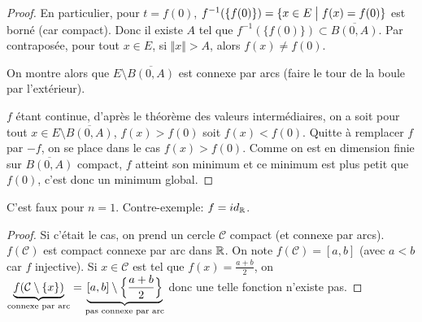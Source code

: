 \begin{proof}
	En particulier, pour $t=f(0)$, $f^{-1}(\{f(0)\})=\{x\in E\bigm| f(x)=f(0)\}$ est borné (car compact). Donc il existe $A$ tel que $f^{-1}(\{f(0)\})\subset\overline{B(0,A)}$. Par contraposée, pour tout $x\in E$, si $\Vert x\Vert>A$, alors $f(x)\neq f(0)$.

	On montre alors que $E\setminus\overline{B(0,A)}$ est connexe par arcs (faire le tour de la boule par l'extérieur).

	$f$ étant continue, d'après le théorème des valeurs intermédiaires, on a soit pour tout $x\in E\setminus\overline{B(0,A)}$, $f(x)>f(0)$ soit $f(x)<f(0)$. Quitte à remplacer $f$ par $-f$, on se place dans le cas $f(x)>f(0)$. Comme on est en dimension finie sur $\overline{B(0,A)}$ compact, $f$ atteint son minimum et ce minimum est plus petit que $f(0)$, c'est donc un minimum global.
\end{proof}

\begin{remark}
	C'est faux pour $n=1$. Contre-exemple: $f=id_{\mathbb{R}}$.
\end{remark}

\begin{proof}
	Si c'était le cas, on prend un cercle $\mathcal{C}$ compact (et connexe par arcs). $f(\mathcal{C})$ est compact connexe par arc dans $\mathbb{R}$. On note $f(\mathcal{C})=[a,b]$ (avec $a<b$ car $f$ injective). Si $x\in\mathcal{C}$ est tel que $f(x)=\frac{a+b}{2}$, on $\underbrace{f(\mathcal{C}\setminus\{x\})}_{\text{connexe par arc}}=\underbrace{[a,b]\setminus\Bigl\{\frac{a+b}{2}\Bigr\}}_{\text{pas connexe par arc}}$ donc une telle fonction n'existe pas.
\end{proof}

